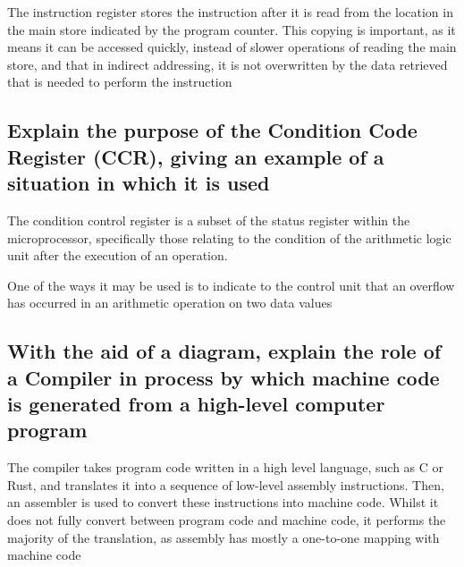 \documentclass{article}
\begin{document}
The instruction register stores the instruction after it is read from
the location in the main store indicated by the program counter. This
copying is important, as it means it can be accessed quickly, instead of
slower operations of reading the main store, and that in indirect
addressing, it is not overwritten by the data retrieved that is needed
to perform the instruction



\subsection{Explain the purpose of the Condition Code Register (CCR),
giving an example of a situation in which it is used}

The condition control register is a subset of the status register within
the microprocessor, specifically those relating to the condition of the
arithmetic logic unit after the execution of an operation.

One of the ways it may be used is to indicate to the control unit that
an overflow has occurred in an arithmetic operation on two data values



\subsection{With the aid of a diagram, explain the role of a Compiler in
process by which machine code is generated from a high-level computer
program}

The compiler takes program code written in a high level language, such
as C or Rust, and translates it into a sequence of low-level assembly
instructions. Then, an assembler is used to convert these instructions
into machine code. Whilst it does not fully convert between program code
and machine code, it performs the majority of the translation, as
assembly has mostly a one-to-one mapping with machine code
\end{document}
